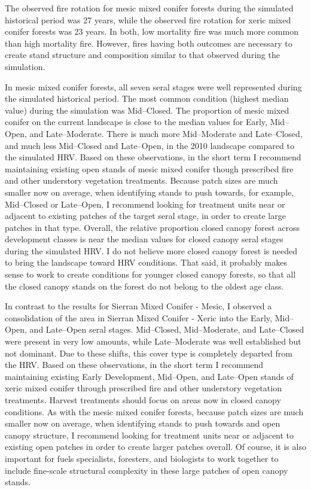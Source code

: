 The observed fire rotation for mesic mixed conifer forests during the simulated historical period was 27 years, while the observed fire rotation for xeric mixed conifer forests was 23 years. In both, low mortality fire was much more common than high mortality fire. However, fires having both outcomes are necessary to create stand structure and composition similar to that observed during the simulation. 

In mesic mixed conifer forests, all seven seral stages were well represented during the simulated historical period. The most common condition (highest median value) during the simulation was Mid--Closed. The proportion of mesic mixed conifer on the current landscape is close to the median values for Early, Mid--Open, and Late--Moderate. There is much more Mid--Moderate and Late--Closed, and much less Mid--Closed and Late--Open, in the 2010 landscape compared to the simulated HRV. Based on these observations, in the short term I recommend maintaining existing open stands of mesic mixed conifer though prescribed fire and other understory vegetation treatments. Because patch sizes are much smaller now on average, when identifying stands to push towards, for example, Mid--Closed or Late--Open, I recommend looking for treatment units near or adjacent to existing patches of the target seral stage, in order to create large patches in that type. Overall, the relative proportion closed canopy forest across development classes is near the median values for closed canopy seral stages during the simulated HRV. I do not believe more closed canopy forest is needed to bring the landscape toward HRV conditions. That said, it probably makes sense to work to create conditions for younger closed canopy forests, so that all the closed canopy stands on the forest do not belong to the oldest age class.

In contrast to the results for Sierran Mixed Conifer - Mesic, I observed a consolidation of the area in Sierran Mixed Conifer - Xeric into the Early, Mid--Open, and Late--Open seral stages. Mid--Closed, Mid--Moderate, and Late--Closed were present in very low amounts, while Late--Moderate was well established but not dominant. Due to these shifts, this cover type is completely departed from the HRV. Based on these observations, in the short term I recommend maintaining existing Early Development, Mid--Open, and Late--Open stands of xeric mixed conifer through prescribed fire and other understory vegetation treatments. Harvest treatments should focus on areas now in closed canopy conditions. As with the mesic mixed conifer forests, because patch sizes are much smaller now on average, when identifying stands to push towards and open canopy structure, I recommend looking for treatment units near or adjacent to existing open patches in order to create larger patches overall. Of course, it is also important for fuels specialists, foresters, and biologists to work together to include fine-scale structural complexity in these large patches of open canopy stands.
 
